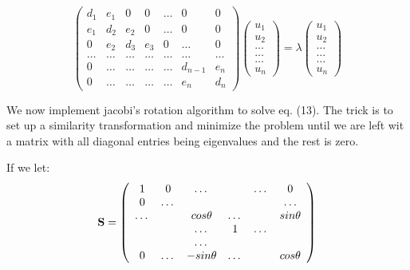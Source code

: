 \documentclass[norsk,a4paper,12pt]{article}
\begin{document}
\begin{equation}
    \left( \begin{array}{ccccccc} d_1 & e_1 & 0   & 0    & \dots  &0     & 0 \\
                                e_1 & d_2 & e_2 & 0    & \dots  &0     &0 \\
                                0   & e_2 & d_3 & e_3  &0       &\dots & 0\\
                                \dots  & \dots & \dots & \dots  &\dots      &\dots & \dots\\
                                0   & \dots & \dots & \dots  &\dots       &d_{n-1} & e_{n}\\
                                0   & \dots & \dots & \dots  &\dots       &e_{n} & d_{n}

             \end{array} \right)      \left( \begin{array}{c} u_{1} \\
                                                              u_{2} \\
                                                              \dots\\ \dots\\ \dots\\
                                                              u_{n}
             \end{array} \right)=\lambda \left( \begin{array}{c} u_{1} \\
                                                              u_{2} \\
                                                              \dots\\ \dots\\ \dots\\
                                                              u_{n}
             \end{array} \right) 
\end{equation} 

We now implement jacobi's rotation algorithm to solve eq. (13). The trick is to set up a similarity transformation
and minimize the problem until we are left wit a matrix with all diagonal entries being eigenvalues and the rest is zero.

If we let:
\begin{equation}
    {\bf S} = \left(\begin{array}{cccccc}
                           1& 0& \dots & &\dots  &0 \\
                           0 & \dots &  & & &\dots  \\
                           \dots& &cos\theta &\dots &  & sin\theta  \\
                           &   & \dots &1   &\dots & \\
                           &   & \dots &  &\\
                           0&\dots   &-sin\theta  &\dots & &cos\theta \\
                      \end{array} \right)
\end{equation}
\end{document}
